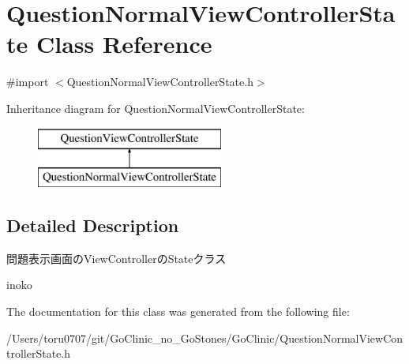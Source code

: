 \hypertarget{interface_question_normal_view_controller_state}{
\section{QuestionNormalViewControllerState Class Reference}
\label{interface_question_normal_view_controller_state}
}


{\ttfamily \#import $<$QuestionNormalViewControllerState.h$>$}

Inheritance diagram for QuestionNormalViewControllerState:\begin{figure}[H]
\begin{center}
\leavevmode
\includegraphics[height=2.000000cm]{interface_question_normal_view_controller_state}
\end{center}
\end{figure}


\subsection{Detailed Description}
問題表示画面のViewControllerのStateクラス

inoko 

The documentation for this class was generated from the following file:\begin{DoxyCompactItemize}
\item 
/Users/toru0707/git/GoClinic\_\-no\_\-GoStones/GoClinic/QuestionNormalViewControllerState.h\end{DoxyCompactItemize}
